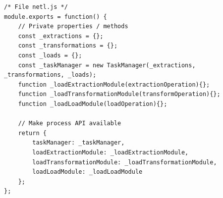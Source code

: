 \begin{verbatim}
/* File netl.js */
module.exports = function() {
    // Private properties / methods
    const _extractions = {};
    const _transformations = {};
    const _loads = {};        
    const _taskManager = new TaskManager(_extractions, _transformations, _loads);
    function _loadExtractionModule(extractionOperation){};
    function _loadTransformationModule(transformOperation){};
    function _loadLoadModule(loadOperation){};

    // Make process API available
    return {
        taskManager: _taskManager,
        loadExtractionModule: _loadExtractionModule,
        loadTransformationModule: _loadTransformationModule,
        loadLoadModule: _loadLoadModule
    };
};
\end{verbatim}
